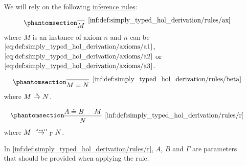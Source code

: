 \begin{definition}
\begin{thmenum}[series=def:simply_typed_hol_derivation]
     We will rely on the following \hyperref[def:inference_rule]{inference rules}:
    \begin{paracol}{3}
      \begin{nthcolumn}{0}
        \ParacolAlignmentHack
        \begin{equation*}\taglabel[\ensuremath{ \logic{Ax}_n }]{inf:def:simply_typed_hol_derivation/rules/ax}
          \begin{prooftree}
            \infer0[\ref{inf:def:simply_typed_hol_derivation/rules/ax}]{ M },
          \end{prooftree}
        \end{equation*}
        where \( M \) is an instance of axiom \( n \) and \( n \) can be \( \eqref{eq:def:simply_typed_hol_derivation/axioms/a1} \), \( \eqref{eq:def:simply_typed_hol_derivation/axioms/a2} \) or \( \eqref{eq:def:simply_typed_hol_derivation/axioms/a3} \).
      \end{nthcolumn}

      \begin{nthcolumn}{1}
        \ParacolAlignmentHack
        \begin{equation*}\taglabel[\ensuremath{ \beta }]{inf:def:simply_typed_hol_derivation/rules/beta}
          \begin{prooftree}
            \infer0[\ref{inf:def:simply_typed_hol_derivation/rules/beta}]{ M \syneq N },
          \end{prooftree}
        \end{equation*}
        where \( M \bred N \).
      \end{nthcolumn}

      \begin{nthcolumn}{2}
        \ParacolAlignmentHack
        \begin{equation*}\taglabel[\ensuremath{ \logic{R} }]{inf:def:simply_typed_hol_derivation/rules/r}
          \begin{prooftree}
            \hypo{ A \syneq B }
            \hypo{ M }
            \infer2[\ref{inf:def:simply_typed_hol_derivation/rules/r}]{ N },
          \end{prooftree}
        \end{equation*}
        where \( M \redrel{A \mapsto B}_\Gamma N \).
      \end{nthcolumn}
    \end{paracol}

    In \ref{inf:def:simply_typed_hol_derivation/rules/r}, \( A \), \( B \) and \( \Gamma \) are parameters that should be provided when applying the rule.


\end{thmenum}
\end{definition}
